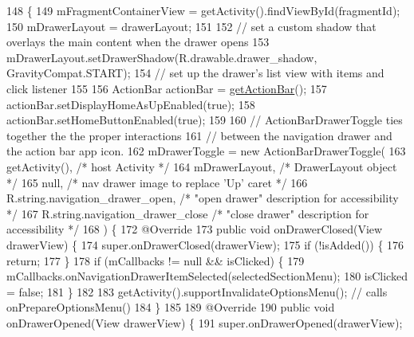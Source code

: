 \begin{DoxyCode}
148                                                                  \{
149         mFragmentContainerView = getActivity().findViewById(fragmentId);
150         mDrawerLayout = drawerLayout;
151 
152         \textcolor{comment}{// set a custom shadow that overlays the main content when the drawer opens}
153         mDrawerLayout.setDrawerShadow(R.drawable.drawer\_shadow, GravityCompat.START);
154         \textcolor{comment}{// set up the drawer's list view with items and click listener}
155 
156         ActionBar actionBar = \hyperlink{classorg_1_1buildmlearn_1_1toolkit_1_1fragment_1_1NavigationDrawerFragment_a84ffac4d244a528b278d27732387b551}{getActionBar}();
157         actionBar.setDisplayHomeAsUpEnabled(\textcolor{keyword}{true});
158         actionBar.setHomeButtonEnabled(\textcolor{keyword}{true});
159 
160         \textcolor{comment}{// ActionBarDrawerToggle ties together the the proper interactions}
161         \textcolor{comment}{// between the navigation drawer and the action bar app icon.}
162         mDrawerToggle = \textcolor{keyword}{new} ActionBarDrawerToggle(
163                 getActivity(),                    \textcolor{comment}{/* host Activity */}
164                 mDrawerLayout,                    \textcolor{comment}{/* DrawerLayout object */}
165                 null,             \textcolor{comment}{/* nav drawer image to replace 'Up' caret */}
166                 R.string.navigation\_drawer\_open,  \textcolor{comment}{/* "open drawer" description for accessibility */}
167                 R.string.navigation\_drawer\_close  \textcolor{comment}{/* "close drawer" description for accessibility */}
168         ) \{
172             @Override
173             \textcolor{keyword}{public} \textcolor{keywordtype}{void} onDrawerClosed(View drawerView) \{
174                 super.onDrawerClosed(drawerView);
175                 \textcolor{keywordflow}{if} (!isAdded()) \{
176                     \textcolor{keywordflow}{return};
177                 \}
178                 \textcolor{keywordflow}{if} (mCallbacks != null && isClicked) \{
179                     mCallbacks.onNavigationDrawerItemSelected(selectedSectionMenu);
180                     isClicked = \textcolor{keyword}{false};
181                 \}
182 
183                 getActivity().supportInvalidateOptionsMenu(); \textcolor{comment}{// calls onPrepareOptionsMenu()}
184             \}
185 
189             @Override
190             \textcolor{keyword}{public} \textcolor{keywordtype}{void} onDrawerOpened(View drawerView) \{
191                 super.onDrawerOpened(drawerView);

\end{DoxyCode}
